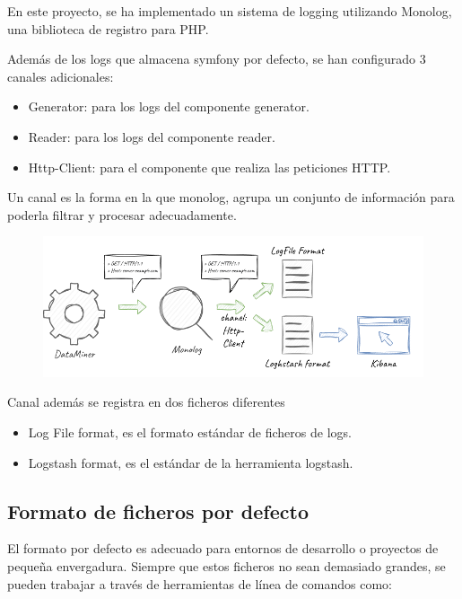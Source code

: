 En este proyecto, se ha implementado un sistema de logging utilizando Monolog, una biblioteca de registro para PHP.

Además de los logs que almacena symfony por defecto, se han configurado 3 canales adicionales:

\begin{itemize}
    \item Generator: para los logs del componente generator.
    \item Reader: para los logs del componente reader.
    \item Http-Client: para el componente que realiza las peticiones HTTP.
\end{itemize}

Un canal es la forma en la que monolog, agrupa un conjunto de información para poderla filtrar y procesar adecuadamente.

\begin{figure}
    \centering
    \includegraphics{./chapter/4/images/ad_4nxe5wisb55id7sbqcwbvoijqjbf3civblmuqf2gzkgnf2kauncps-gmu7iae0ck9ftwme-orgudhewur7els5nwraevj38i0}
    \caption{}
    \label{fig:ad_4nxe5wisb55id7sbqcwbvoijqjbf3civblmuqf2gzkgnf2kauncps-gmu7iae0ck9ftwme-orgudhewur7els5nwraevj38i0}
\end{figure}

Canal además se registra en dos ficheros diferentes

\begin{itemize}
    \item Log File format, es el formato estándar de ficheros de logs.
    \item Logstash format, es el estándar de la herramienta logstash.
\end{itemize}

\subsection*{Formato de ficheros por defecto}
El formato por defecto es adecuado para entornos de desarrollo o proyectos de pequeña envergadura. Siempre que estos ficheros no sean demasiado grandes, se pueden trabajar a través de herramientas de línea de comandos como:

